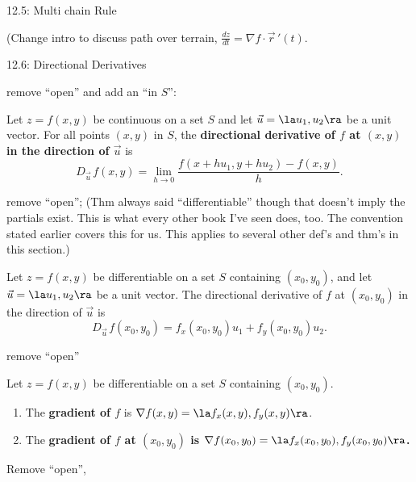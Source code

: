 \documentclass{article}
\begin{document}
12.5: Multi chain Rule

(Change intro to discuss path over terrain, $\frac{dz}{dt} = \nabla f \cdot \vec r\,'(t)$.

12.6: Directional Derivatives

remove ``open'' and add an ``in $S$'':

{Let $z=f(x,y)$ be continuous on a set $S$ and let $\vec u = \la u_1,u_2\ra$ be a unit vector. For all points $(x,y)$ in $S$, the \textbf{directional derivative of $f$ at $(x,y)$ in the direction of $\vec u$} is
$$D_{\vec u\,}f(x,y) = \lim_{h\to 0} \frac{f(x+hu_1,y+hu_2) - f(x,y)}h.$$
}

remove ``open''; (Thm always said ``differentiable'' though that doesn't imply the partials exist. This is what every other book I've seen does, too. The convention stated earlier covers this for us. This applies to several other def's and thm's in this section.)

{Let $z=f(x,y)$ be differentiable on a set $S$ containing $(x_0,y_0)$, and let $\vec u = \la u_1,u_2\ra$ be a unit vector. The directional derivative of $f$ at $(x_0,y_0)$ in the direction of $\vec u$ is
$$D_{\vec u\,}f(x_0,y_0)=f_x(x_0,y_0)u_1 + f_y(x_0,y_0)u_2.$$
}

remove ``open''

{Let $z=f(x,y)$ be differentiable on a set $S$ containing $(x_0,y_0)$.
\begin{enumerate}
	\item The \textbf{gradient of $f$} is $\nabla f(x,y) = \la f_x(x,y),f_y(x,y)\ra$.
	\item The \textbf{gradient of $f$ at $(x_0,y_0)$ is $\nabla f(x_0,y_0) = \la f_x(x_0,y_0),f_y(x_0,y_0)\ra$.}
\end{enumerate}
}

Remove ``open'', 
\end{document}
